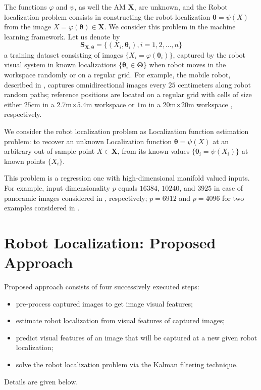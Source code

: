 \documentclass[conference]{IEEEtran} %
\def\mbTheta{{\bm\Theta}}
\def\mbtheta{{\bm\theta}}
\def\mbX{\mathbf{X}}
\def\mbS{\mathbf{S}}
\begin{document}
The functions $\varphi$ and $\psi$, as well the AM $\mbX$, are unknown, and the Robot localization problem consists in constructing the robot localization $\mbtheta = \psi(X)$ from the image $X = \varphi(\mbtheta) \in \mbX$. We consider this problem in the machine learning framework. Let us denote by 
\begin{equation}
\label{eq3}
	\mbS_{\mathbf{X},\mbtheta} = \{(X_i,\mbtheta_i), i = 1, 2, \ldots, n\} 	
\end{equation}
a training dataset consisting of images $\{X_i = \varphi(\mbtheta_i)\}$, captured by the robot visual system in known localizations $\{\mbtheta_i \in \mbTheta\}$ when robot moves in the workspace randomly or on a regular grid. For example, the mobile robot, described in \cite{bib7}, captures omnidirectional images every $25$ centimeters along robot random paths; reference positions are located on a regular grid with cells of size either $25$cm in a $2.7$m$\times5.4$m workspace \cite{bib8} or $1$m in a $20$m$\times20$m workspace \cite{bib9}, respectively. 

We consider the robot localization problem as Localization function estimation problem: to recover an unknown Localization function $\mbtheta = \psi(X)$ at an arbitrary out-of-sample point $X \in \mbX$, from its known values $\{\mbtheta_i = \psi(X_i)\}$ at known points $\{X_i\}$.

This problem is a regression one with high-dimensional manifold valued inputs. For example, input dimensionality $p$ equals $16384$, $10240$, and $3925$ in case of panoramic images considered in \cite{bib7,bib8,bib9}, respectively; $p = 6912$ and $p = 4096$ for two examples considered in \cite{bib10}.

\section{Robot Localization: Proposed Approach}
\label{sec3}

Proposed approach consists of four successively executed steps:
\begin{itemize}
	\item 
    	pre-process captured images to get image visual features;
     \item 
     	estimate robot localization from visual features of captured images;
     \item 
     	predict visual features of an image that will be captured at a new given robot localization;
     \item 
     	solve the robot localization problem via the Kalman filtering technique.
\end{itemize}
Details are given below.
\end{document}
